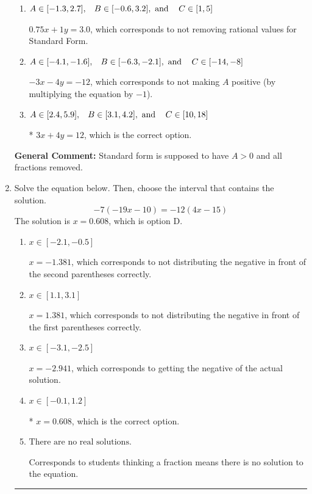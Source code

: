 \documentclass{extbook}[14pt]
\newcommand{\litem}[1]{\item #1

\rule{\textwidth}{0.4pt}}
\begin{document}
\begin{enumerate}
{\begin{enumerate}[label=\Alph*.]
 $0.75x - 1y = -3.0$, which corresponds to using the opposite (negative) slope of the graph and not removing rational values.
\item \( A \in [-1.3, 2.7], \hspace{3mm} B \in [-0.6, 3.2], \text{ and } \hspace{3mm} C \in [1, 5] \)

 $0.75x + 1y = 3.0$, which corresponds to not removing rational values for Standard Form.
\item \( A \in [-4.1, -1.6], \hspace{3mm} B \in [-6.3, -2.1], \text{ and } \hspace{3mm} C \in [-14, -8] \)

 $-3x - 4y = -12$, which corresponds to not making $A$ positive (by multiplying the equation by $-1$).
\item \( A \in [2.4, 5.9], \hspace{3mm} B \in [3.1, 4.2], \text{ and } \hspace{3mm} C \in [10, 18] \)

* $3x + 4y = 12$, which is the correct option.
\end{enumerate}

\textbf{General Comment:} Standard form is supposed to have $A > 0$ and all fractions removed.
}
\litem{
Solve the equation below. Then, choose the interval that contains the solution.
\[ -7(-19x -10) = -12(4x -15) \]The solution is \( x = 0.608 \), which is option D.\begin{enumerate}[label=\Alph*.]
\item \( x \in [-2.1, -0.5] \)

$x = -1.381$, which corresponds to not distributing the negative in front of the second parentheses correctly.
\item \( x \in [1.1, 3.1] \)

$x = 1.381$, which corresponds to not distributing the negative in front of the first parentheses correctly.
\item \( x \in [-3.1, -2.5] \)

$x = -2.941$, which corresponds to getting the negative of the actual solution.
\item \( x \in [-0.1, 1.2] \)

* $x = 0.608$, which is the correct option.
\item \( \text{There are no real solutions.} \)

Corresponds to students thinking a fraction means there is no solution to the equation.
\end{enumerate}

}
\end{enumerate}
\end{document}
